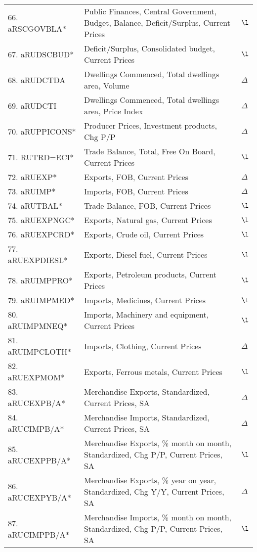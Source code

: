 \documentclass[a4paper, 14pt]{article}
\begin{document}
\begin{center}
\begin{longtable}{p{5.5cm} p{10cm} p{0.15cm}}
	66. aRSCGOVBLA* &  Public Finances, Central Government, Budget, Balance, Deficit/Surplus, Current Prices & $\l$\\
	67. aRUDSCBUD* &  Deficit/Surplus, Consolidated budget, Current Prices & $\l$\\
	68. aRUDCTDA &  Dwellings Commenced, Total dwellings area, Volume & $\Delta$\\
	69. aRUDCTI &  Dwellings Commenced, Total dwellings area, Price Index & $\Delta$\\
	70. aRUPPICONS* &  Producer Prices, Investment products, Chg P/P & $\Delta$\\
	71. RUTRD=ECI* &  Trade Balance, Total, Free On Board, Current Prices & $\l$\\
	72. aRUEXP* &  Exports, FOB, Current Prices & $\Delta$\\
	73. aRUIMP* &  Imports, FOB, Current Prices & $\Delta$\\
	74. aRUTBAL* &  Trade Balance, FOB, Current Prices & $\l$\\
	75. aRUEXPNGC* &  Exports, Natural gas, Current Prices & $\l$\\
	76. aRUEXPCRD* &  Exports, Crude oil, Current Prices & $\l$\\
	77. aRUEXPDIESL* &  Exports, Diesel fuel, Current Prices & $\l$\\
	78. aRUIMPPRO* &  Exports, Petroleum products, Current Prices & $\l$\\
	79. aRUIMPMED* &  Imports, Medicines, Current Prices & $\l$\\
	80. aRUIMPMNEQ* &  Imports, Machinery and equipment, Current Prices & $\l$\\
	81. aRUIMPCLOTH* &  Imports, Clothing, Current Prices & $\Delta$\\
	82. aRUEXPMOM* &  Exports, Ferrous metals, Current Prices & $\l$\\
	83. aRUCEXPB/A* &  Merchandise Exports, Standardized, Current Prices, SA & $\Delta$\\
	84. aRUCIMPB/A* &  Merchandise Imports, Standardized, Current Prices, SA & $\Delta$\\
	85. aRUCEXPPB/A* &  Merchandise Exports, \% month on month, Standardized, Chg P/P, Current Prices, SA & $\l$\\
	86. aRUCEXPYB/A* &  Merchandise Exports, \% year on year, Standardized, Chg Y/Y, Current Prices, SA & $\Delta$\\
	87. aRUCIMPPB/A* &  Merchandise Imports, \% month on month, Standardized, Chg P/P, Current Prices, SA & $\l$\\

\end{longtable}
\end{center}
\end{document}
